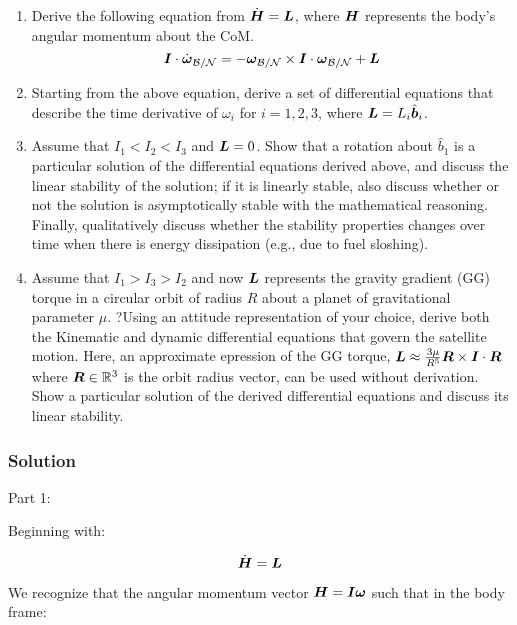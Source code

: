 \begin{enumerate}
    \item Derive the following equation from $\dot{\boldsymbol{H}} = \boldsymbol{L}$, where $\boldsymbol{H}$ represents the body's angular momentum about the CoM.
    \begin{equation}
        \boldsymbol{I} \cdot \dot{\boldsymbol{\omega}}_\mathcal{B/N} = -\boldsymbol{\omega}_\mathcal{B/N} \times \boldsymbol{I} \cdot \boldsymbol{\omega}_\mathcal{B/N} + \boldsymbol{L}
    \end{equation}
    \item Starting from the above equation, derive a set of differential equations that describe the time derivative of $\omega_i$ for $i = 1,2,3$, where $\boldsymbol{L} = L_i \hat{\boldsymbol{b}}_i$.
    \item Assume that $I_1 < I_2 < I_3$ and $\boldsymbol{L} = 0$. Show that a rotation about $\hat{b}_1$ is a particular solution of the differential equations derived above, and discuss the linear stability of the solution; if it is linearly stable, also discuss whether or not the solution is asymptotically stable with the mathematical reasoning. Finally, qualitatively discuss whether the stability properties changes over time when there is energy dissipation (e.g., due to fuel sloshing).
    \item Assume that $I_1 > I_3 > I_2$ and now $\boldsymbol{L}$ represents the gravity gradient (GG) torque in a circular orbit of radius $R$ about a planet of gravitational parameter $\mu$. ?Using an attitude representation of your choice, derive both the Kinematic and dynamic differential equations that govern the satellite motion. Here, an approximate epression of the GG torque, $\boldsymbol{L} \approx \frac{3\mu}{R^5} \boldsymbol{R} \times \boldsymbol{I} \cdot \boldsymbol{R}$ where $\boldsymbol{R} \in \mathbb{R}^3$ is the orbit radius vector, can be used without derivation. Show a particular solution of the derived differential equations and discuss its linear stability.
\end{enumerate}

\subsubsection{Solution}

Part 1: 

Beginning with:

\begin{equation}
    \dot{\boldsymbol{H}} = \boldsymbol{L}
\end{equation}

We recognize that the angular momentum vector $\boldsymbol{H} = \boldsymbol{I} \boldsymbol{\omega}$ such that in the body frame:


